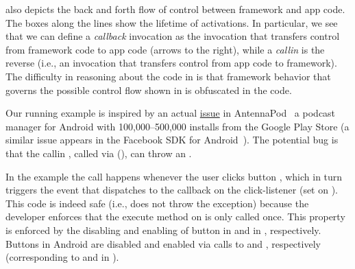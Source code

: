 \documentclass[10pt,reprint,nocopyrightspace,numbers]{sigplanconf}
\begin{document}
 also depicts the back and forth flow of
control between framework and app code.
The boxes along the lines show the lifetime of activations.
In particular, we see that we can define a \emph{callback} invocation as the
invocation that transfers control from framework code to app code
(arrows to the right), while a \emph{callin} is the reverse (i.e., an
invocation that transfers control from app code to framework).
The difficulty in reasoning about the code in  is that framework behavior that governs the possible control flow shown in  is obfuscated in the code.

Our running example is inspired by an actual
\href{https://github.com/AntennaPod/AntennaPod/issues/1304}{issue} in
AntennaPod~\cite{antennapodbug}
a podcast manager for Android with 100,000--500,000 installs from the
Google Play
Store%
(a similar issue appears in the Facebook SDK for Android~\cite{facebookbug}).
%
The potential bug is that the callin , called
via  (),
can throw an .

In the example the  call happens whenever the user
clicks button , which in turn triggers the event that dispatches to the
 callback on the click-listener (set on ). 
%
This code is indeed safe (i.e., does not throw the exception) because
the developer enforces that the execute method on 
is only called once. This property is enforced by the disabling and enabling of
button  in
and in , respectively.
Buttons in Android are disabled and enabled via calls to  and , respectively (corresponding to  and  in ).
\end{document}
